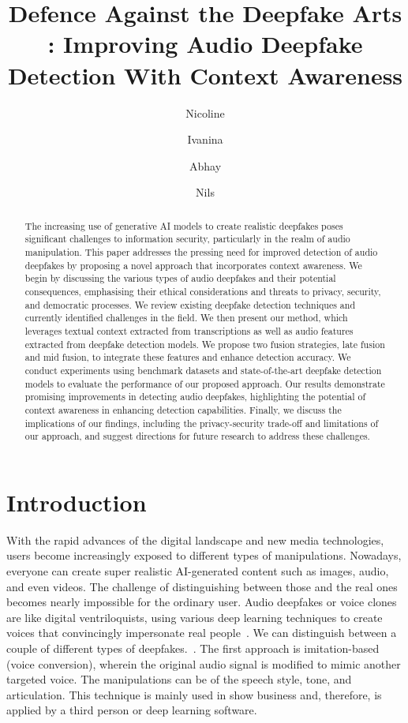 \documentclass{Interspeech}
\title{Defence Against the Deepfake Arts : Improving Audio Deepfake Detection With Context Awareness}
\author[affiliation={1}]{Nicoline}{Nymand-Andersen}
\author[affiliation={1}]{Ivanina}{Ivanova}
\author[affiliation={1}]{Abhay}{Dayal Mathur}
\author[affiliation={1}]{Nils}{Holzenberger}
\affiliation{First Department}{First Affiliation}{First Country}
\affiliation{Second Department}{Second Affiliation}{Second Country}
\affiliation{}{Just Institute}{And Country}
\begin{document}
\maketitle

\begin{abstract}

  The increasing use of generative AI models to create realistic deepfakes poses significant challenges to information security, particularly in the realm of audio manipulation. This paper addresses the pressing need for improved detection of audio deepfakes by proposing a novel approach that incorporates context awareness. We begin by discussing the various types of audio deepfakes and their potential consequences, emphasising their ethical considerations and threats to privacy, security, and democratic processes. We review existing deepfake detection techniques and currently identified challenges in the field. We then present our method, which leverages textual context extracted from transcriptions as well as audio features extracted from deepfake detection models. We propose two fusion strategies, late fusion and mid fusion, to integrate these features and enhance detection accuracy. We conduct experiments using benchmark datasets and state-of-the-art deepfake detection models to evaluate the performance of our proposed approach. Our results demonstrate promising improvements in detecting audio deepfakes, highlighting the potential of context awareness in enhancing detection capabilities. Finally, we discuss the implications of our findings, including the privacy-security trade-off and limitations of our approach, and suggest directions for future research to address these challenges.
\end{abstract}

\section{Introduction}
\label{sec:introduction}

With the rapid advances of the digital landscape and new media technologies,
users become increasingly exposed to different types of manipulations.
Nowadays, everyone can create super realistic AI-generated content such as
images, audio, and even videos. The challenge of distinguishing between those
and the real ones becomes nearly impossible for the ordinary user. Audio
deepfakes or voice clones are like digital ventriloquists, using various deep
learning techniques to create voices that convincingly impersonate real
people~\cite{adversarial}. We can distinguish between a couple of different
types of deepfakes.~\cite{review_audio_deepfake_issues}. The first approach is
imitation-based (voice conversion), wherein the original audio signal is
modified to mimic another targeted voice. The manipulations can be of the
speech style, tone, and articulation. This technique is mainly used in show
business and, therefore, is applied by a third person or deep learning
software.
\end{document}
